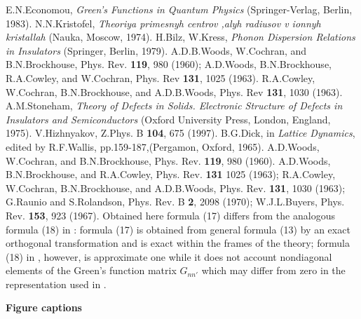 \begin{thebibliography}{99}
E.N.Economou, {\it Green's Functions in Quantum Physics}
(Springer-Verlag, Berlin, 1983).
N.N.Kristofel, {\it Theoriya primesnyh centrov ,alyh radiusov
v ionnyh kristallah}  (Nauka, Moscow, 1974).
H.Bilz, W.Kress, {\it Phonon Dispersion Relations in
Insulators} (Springer, Berlin, 1979).
A.D.B.Woods, W.Cochran, and B.N.Brockhouse,
Phys. Rev. {\bf 119}, 980 (1960);
A.D.Woods, B.N.Brockhouse, R.A.Cowley, and W.Cochran,
Phys. Rev {\bf 131}, 1025 (1963).
R.A.Cowley, W.Cochran, B.N.Brockhouse, and A.D.B.Woods,
Phys. Rev {\bf 131}, 1030 (1963).
A.M.Stoneham, {\it Theory of Defects in Solids. Electronic Structure of Defects
in Insulators and Semiconductors} (Oxford University Press, London, England, 
1975).
V.Hizhnyakov, Z.Phys. B {\bf 104}, 675 (1997).
B.G.Dick, in {\it Lattice Dynamics}, edited by R.F.Wallis, 
pp.159-187,(Pergamon, Oxford,
1965).
A.D.Woods, W.Cochran, and B.N.Brockhouse,
Phys. Rev. {\bf 119}, 980 (1960).
A.D.Woods, B.N.Brockhouse, and R.A.Cowley,
Phys. Rev. {\bf 131} 1025 (1963); R.A.Cowley, W.Cochran, B.N.Brockhouse, and
A.D.B.Woods, Phys. Rev. {\bf 131}, 1030 (1963);
G.Raunio and S.Rolandson, Phys. Rev. B {\bf 2}, 2098 (1970);
W.J.L.Buyers, Phys. Rev. {\bf 153}, 923 (1967).
Obtained here formula (17) differs from the analogous formula (18)
in \cite{hizhrev}: formula (17) is obtained from general formula (13)
by an exact orthogonal transformation and is exact within the frames
of the theory; formula (18) in \cite{hizhrev}, however, is approximate one
while it
does not account nondiagonal elements of the Green's function matrix
$G_{nn'}$ which may differ from zero in the representation used 
in \cite{hizhrev}.
\end{thebibliography}

\newpage
\begin{center}
{\LARGE {\bf Figure captions}}
\end{center}

\bigskip

